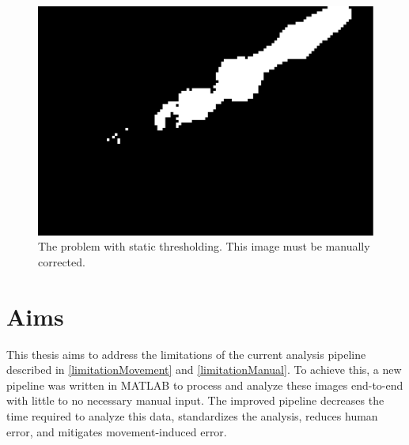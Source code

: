 \begin{figure}[ht]
    \centering
    \includegraphics[scale=.25]{Figures/rendered_files/segmentation_naive}
    \decoRule
    \caption[The problem with static thresholding]{The problem with static thresholding. This image must be manually corrected.}
    \label{fig:SegmentationNaive}
\end{figure}

\section{Aims}
This thesis aims to address the limitations of the current analysis pipeline described in \ref{limitationMovement} and \ref{limitationManual}. To achieve this, a new pipeline was written in MATLAB to process and analyze these images end-to-end with little to no necessary manual input. The improved pipeline decreases the time required to analyze this data, standardizes the analysis, reduces human error, and mitigates movement-induced error.
